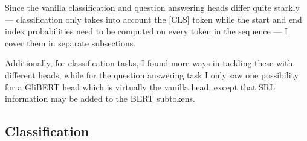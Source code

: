 Since the vanilla classification and question answering heads differ quite
starkly --- classification only takes into account the [CLS] token while
the start and end index probabilities need to be computed on every token
in the sequence --- I cover them in separate subsections.


Additionally, for classification tasks, I found more ways in tackling these
with different heads, while for the question answering task I only saw one
possibility for a GliBERT head which is virtually the vanilla head, except
that SRL information may be added to the BERT subtokens.

\subsection{Classification}






